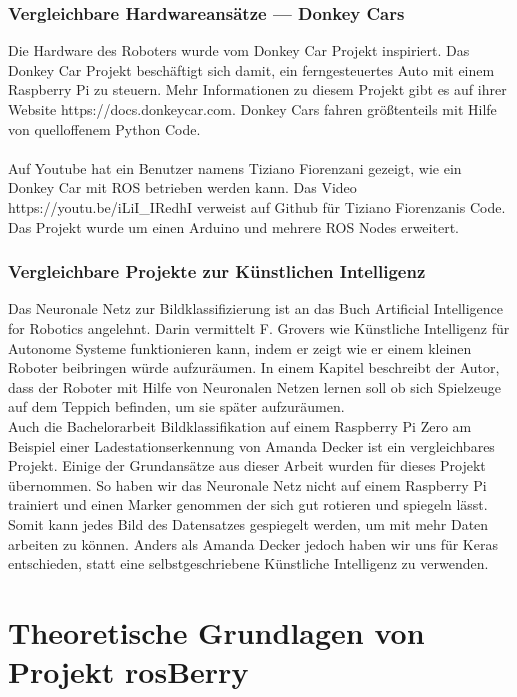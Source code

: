 \documentclass[conference]{IEEEtran}
\begin{document}
\subsubsection{Vergleichbare Hardwareansätze — Donkey Cars} %
Die Hardware des Roboters wurde vom Donkey Car Projekt inspiriert.
Das Donkey Car Projekt beschäftigt sich damit, ein ferngesteuertes Auto mit einem Raspberry Pi zu steuern.
Mehr Informationen zu diesem Projekt gibt es auf ihrer Website https://docs.donkeycar.com.
Donkey Cars fahren größtenteils mit Hilfe von quelloffenem Python Code. \\
\\
Auf Youtube hat ein Benutzer namens Tiziano Fiorenzani gezeigt, wie ein Donkey Car mit ROS betrieben werden kann.
Das Video https://youtu.be/iLiI\_IRedhI verweist auf Github für Tiziano Fiorenzanis Code.
Das Projekt wurde um einen Arduino und mehrere ROS Nodes erweitert.

\subsubsection{Vergleichbare Projekte zur Künstlichen Intelligenz} %
Das Neuronale Netz zur Bildklassifizierung ist an das Buch \glqq Artificial Intelligence for Robotics\grqq  \cite{b1} angelehnt.
Darin vermittelt F. Grovers wie Künstliche Intelligenz für Autonome Systeme funktionieren kann, indem er zeigt wie er einem kleinen Roboter beibringen würde aufzuräumen.
In einem Kapitel beschreibt der Autor, dass der Roboter mit Hilfe von Neuronalen Netzen lernen soll ob sich Spielzeuge auf dem Teppich befinden, um sie später aufzuräumen.\\

Auch die Bachelorarbeit \glqq Bildklassifikation auf einem Raspberry Pi Zero am Beispiel einer Ladestationserkennung\grqq \cite{b2} von Amanda Decker ist ein vergleichbares Projekt.
Einige der Grundansätze aus dieser Arbeit wurden für dieses Projekt übernommen.
So haben wir das Neuronale Netz nicht auf einem Raspberry Pi trainiert und einen Marker genommen der sich gut rotieren und spiegeln lässt.
Somit kann jedes Bild des Datensatzes gespiegelt werden, um mit mehr Daten arbeiten zu können.
Anders als Amanda Decker jedoch haben wir uns für Keras entschieden, statt eine selbstgeschriebene Künstliche Intelligenz zu verwenden.

\section{Theoretische Grundlagen von Projekt rosBerry}
\end{document}
